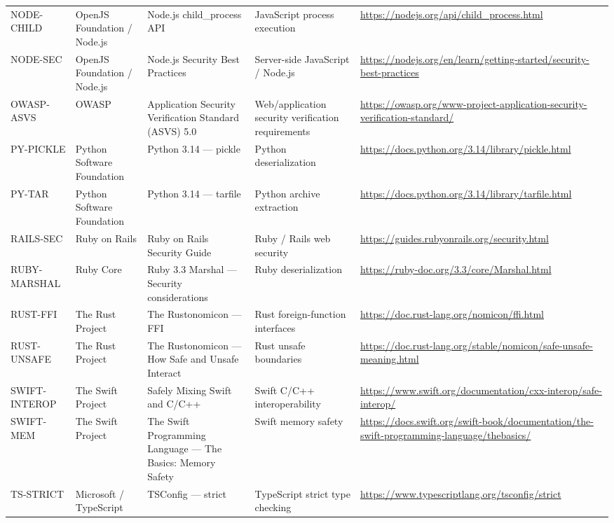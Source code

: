 \documentclass[10pt,letterpaper]{article}
\begin{document}
\begin{landscape}
\begin{longtable}{@{}P{0.82in}P{1.23in}P{2.25in}P{1.7in}P{3.0in}@{}}
NODE-CHILD & OpenJS Foundation / Node.js & Node.js child\_process API & JavaScript process execution & \url{https://nodejs.org/api/child_process.html}\\
NODE-SEC & OpenJS Foundation / Node.js & Node.js Security Best Practices & Server-side JavaScript / Node.js & \url{https://nodejs.org/en/learn/getting-started/security-best-practices}\\
OWASP-ASVS & OWASP & Application Security Verification Standard (ASVS) 5.0 & Web/application security verification requirements & \url{https://owasp.org/www-project-application-security-verification-standard/}\\
PY-PICKLE & Python Software Foundation & Python 3.14 --- pickle & Python deserialization & \url{https://docs.python.org/3.14/library/pickle.html}\\
PY-TAR & Python Software Foundation & Python 3.14 --- tarfile & Python archive extraction & \url{https://docs.python.org/3.14/library/tarfile.html}\\
RAILS-SEC & Ruby on Rails & Ruby on Rails Security Guide & Ruby / Rails web security & \url{https://guides.rubyonrails.org/security.html}\\
RUBY-MARSHAL & Ruby Core & Ruby 3.3 Marshal --- Security considerations & Ruby deserialization & \url{https://ruby-doc.org/3.3/core/Marshal.html}\\
RUST-FFI & The Rust Project & The Rustonomicon --- FFI & Rust foreign-function interfaces & \url{https://doc.rust-lang.org/nomicon/ffi.html}\\
RUST-UNSAFE & The Rust Project & The Rustonomicon --- How Safe and Unsafe Interact & Rust unsafe boundaries & \url{https://doc.rust-lang.org/stable/nomicon/safe-unsafe-meaning.html}\\
SWIFT-INTEROP & The Swift Project & Safely Mixing Swift and C/C++ & Swift C/C++ interoperability & \url{https://www.swift.org/documentation/cxx-interop/safe-interop/}\\
SWIFT-MEM & The Swift Project & The Swift Programming Language --- The Basics: Memory Safety & Swift memory safety & \url{https://docs.swift.org/swift-book/documentation/the-swift-programming-language/thebasics/}\\
TS-STRICT & Microsoft / TypeScript & TSConfig --- strict & TypeScript strict type checking & \url{https://www.typescriptlang.org/tsconfig/strict}\\
\bottomrule
\end{longtable}
\normalsize
\end{landscape}
\end{document}
